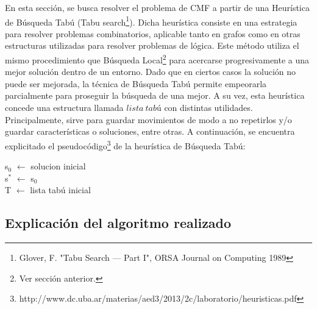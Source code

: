 En esta sección, se busca resolver el problema de CMF a partir de una Heurística de Búsqueda Tabú (Tabu search\footnote{Glover, F. "Tabu Search — Part I", ORSA Journal on Computing 1989}). Dicha heurística consiste en una estrategia para resolver problemas combinatorios, aplicable tanto en grafos como en otras estructuras utilizadas para resolver problemas de lógica. Este método utiliza el mismo procedimiento que Búsqueda Local\footnote{Ver sección anterior.} para acercarse progresivamente a una mejor solución dentro de un entorno. Dado que en ciertos casos la solución no puede ser mejorada, la técnica de Búsqueda Tabú permite empeorarla parcialmente para proseguir la búsqueda de una mejor. A su vez, esta heurística concede una estructura llamada $lista\ tabú$ con distintas utilidades. Principalmente, sirve para guardar movimientos de modo a no repetirlos y/o guardar características o soluciones, entre otras. A continuación, se encuentra explicitado el pseudocódigo\footnote{http://www.dc.uba.ar/materias/aed3/2013/2c/laboratorio/heuristicas.pdf} de la heurística de Búsqueda Tabú:

\begin{algorithm}[H]
\SetAlgoLined
s$_{0}$ $\leftarrow$ solucion inicial \\
s$^{*}$ $\leftarrow$ s$_{0}$ \\
T $\leftarrow$ lista tabú inicial \\
\end{algorithm}

\subsection{Explicación del algoritmo realizado}

